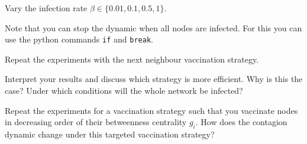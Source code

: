 Vary the infection rate $\beta \in \{0.01,0.1,0.5,1\}$.

Note that you can stop the dynamic when all nodes are infected. For this you can use the python commands {\tt if} and {\tt break}.

Repeat the experiments with the next neighbour vaccination strategy. 

Interpret your results and discuss which strategy is more efficient. Why is this the case? Under which conditions will the whole network be infected?


\subexercise[%
  topic= Optional: Vaccination by \emph{Betweenness} Centrality,
    ]
    
    Repeat the experiments for a vaccination strategy such that you vaccinate nodes in decreasing order of their betweenness centrality $g_i$. How does the contagion dynamic change under this targeted vaccination strategy?
   




